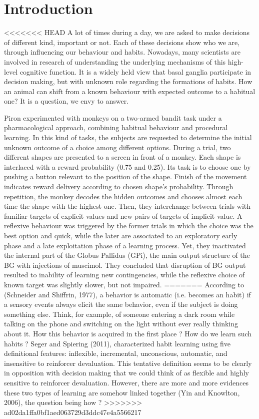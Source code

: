 \section{Introduction}

<<<<<<< HEAD
	A lot of times during a day, we are asked to make decisions of different kind, important or not. Each of these decisions show who we are, through influencing our behaviour and habits. Nowadays, many scientists are involved in research of understanding the underlying mechanisms of this high-level cognitive function. It is a widely held view that basal ganglia participate in decision making, but with unknown role regarding the formations of habits. How an animal can shift from a known behaviour with expected outcome to a habitual one? It is a question, we envy to answer.
	
	Piron experimented with monkeys on a two-armed bandit task under a pharmacological approach, combining habitual behaviour and procedural learning. In this kind of tasks, the subjects are requested to determine the initial unknown outcome of a choice among different options. During a trial, two different shapes are presented to a screen in front of a monkey. Each shape is interlaced with a reward probability (0.75 and 0.25). Its task is to choose one by pushing a button relevant to the position of the shape. Finish of the movement indicates reward delivery according to chosen shape's probability. Through repetition, the monkey decodes the hidden outcomes and chooses almost each time the shape with the highest one. Then, they interchange between trials with familiar targets of explicit values and new pairs of targets of implicit value. A reflexive behaviour was triggered by the former trials in which the choice was the best option and quick, while the later are associated to an exploratory early phase and a late exploitation phase of a learning process. Yet, they inactivated the internal part of the Globus Pallidus (GPi), the main output structure of the BG with injections of muscimol. They concluded that disruption of BG output resulted to inability of learning new contingencies, while the reflexive choice of known target was slightly slower, but not impaired.
=======
According to (Schneider and Shiffrin, 1977), a behavior is automatic
(i.e. becomes an habit) if a sensory events always elicit the same behavior,
even if the subject is doing something else. Think, for example, of someone
entering a dark room while talking on the phone and switching on the light
without ever really thinking about it. How this behavior is acquired in the
first place ? How do we learn such habits ? Seger and Spiering (2011),
characterized habit learning using five definitional features: inflexible,
incremental, unconscious, automatic, and insensitive to reinforcer
devaluation. This tentative definition seems to be clearly in opposition with
decision making that we could think of as flexible and highly sensitive to
reinforcer devaluation. However, there are more and more evidences these two
types of learning are somehow linked together (Yin and Knowlton, 2006), the
question being how ?
>>>>>>> ad02da1ffa0bf1aed063729d3ddc47e4a5566217

